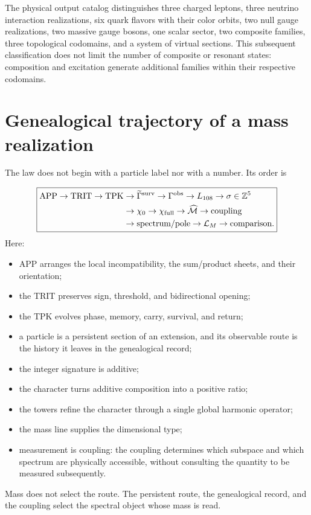The physical output catalog distinguishes three charged leptons, three neutrino interaction realizations, six quark flavors with their color orbits, two null gauge realizations, two massive gauge bosons, one scalar sector, two composite families, three topological codomains, and a system of virtual sections. This subsequent classification does not limit the number of composite or resonant states: composition and excitation generate additional families within their respective codomains.

\section{Genealogical trajectory of a mass realization}
The law does not begin with a particle label nor with a number. Its order is

\[
\boxed{
\begin{aligned}
\mathrm{APP}\to\mathrm{TRIT}\to\mathrm{TPK}
&\to\widetilde\Gamma^{\rm surv}
\to\Gamma^{\rm obs}
\to L_{108}
\to\sigma\in\mathbb Z^5\\
&\to\chi_0
\to\chi_{\rm full}
\to\widehat{\mathcal M}
\to\text{coupling}\\
&\to\text{spectrum/pole}
\to\mathcal L_M
\to\text{comparison}.
\end{aligned}}
\]
Here:

\begin{itemize}
\item APP arranges the local incompatibility, the sum/product sheets,
and their orientation;
\item the TRIT preserves sign, threshold, and bidirectional opening;
\item the TPK evolves phase, memory, carry, survival, and return;
\item a particle is a persistent section of an extension, and its observable route is
the history it leaves in the genealogical record;

\item the integer signature is additive;
\item the character turns additive composition into a positive ratio;
\item the towers refine the character through a single global harmonic operator;
\item the mass line supplies the dimensional type;
\item measurement is coupling: the coupling determines which subspace and which spectrum are
physically accessible, without consulting the quantity to be measured subsequently.

\end{itemize}
Mass does not select the route. The persistent route, the genealogical record, and the coupling select the spectral object whose mass is read.

